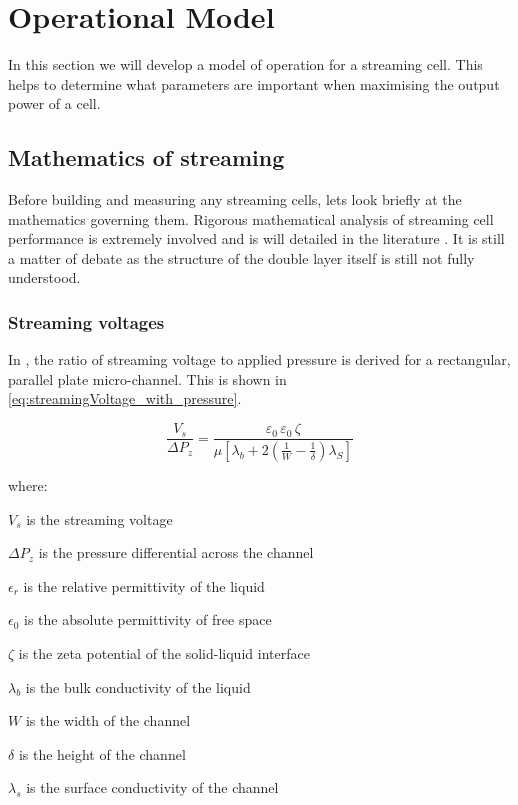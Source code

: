 
\section{Operational Model}

In this section we will develop a model of operation for a streaming cell.
This helps to determine what parameters are important when maximising the output power of a cell.

\subsection{Mathematics of streaming}

Before building and measuring any streaming cells, lets look briefly at the mathematics governing them.
Rigorous mathematical analysis of streaming cell performance is extremely involved and is will detailed in the literature \cite{Yang1998}.
It is still a matter of debate as the structure of the double layer itself is still not fully understood.

\subsubsection*{Streaming voltages}

In \cite{Gu2000a}, the ratio of streaming voltage to applied pressure is derived for a rectangular, parallel plate micro-channel.
This is shown in \cref{eq:streamingVoltage_with_pressure}.

\begin{equation}
\frac{V_{s}}{\Delta P_{z}} = \frac{\varepsilon_{0}\,\varepsilon_{0}\,\zeta}{\mu[\lambda_{b}+2(\frac{1}{W}-\frac{1}{\delta})\lambda_{S}]}
\label{eq:streamingVoltage_with_pressure}
\end{equation}

\noindent where:
\begin{description}
    \item $V_{s}$ is the streaming voltage
    \item $\Delta P_{z}$ is the pressure differential across the channel
    \item $\epsilon_{r}$ is the relative permittivity of the liquid
    \item $\epsilon_{0}$ is the absolute permittivity of free space
    \item $\zeta$ is the zeta potential of the solid-liquid interface
    \item $\lambda_{b}$ is the bulk conductivity of the liquid
    \item $W$ is the width of the channel
    \item $\delta$ is the height of the channel
    \item $\lambda_{s}$ is the surface conductivity of the channel
\end{description}

